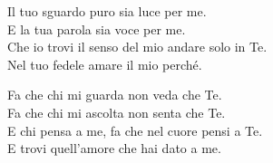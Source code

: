

\spazio

\strofa Il tuo sguardo puro sia luce per me.\\
E la tua parola sia voce per me.\\
Che io trovi il senso del mio andare solo in Te.\\
Nel tuo fedele amare il mio perché.

\spazio


\spazio

\strofa Fa che chi mi guarda non veda che Te.\\
Fa che chi mi ascolta non senta che Te.\\
E chi pensa a me, fa che nel cuore pensi a Te.\\
E trovi quell'amore che hai dato a me.

\spazio

